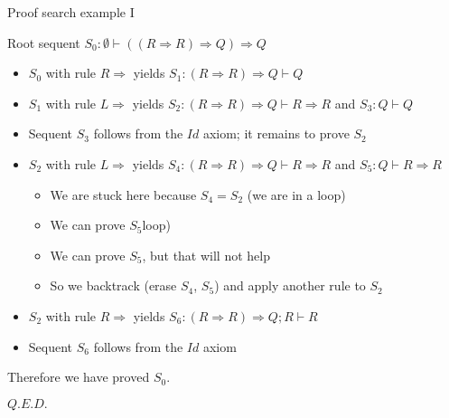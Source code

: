 \documentclass[english]{beamer}
\begin{document}
\begin{frame}{Proof search example I}

Root sequent $S_{0}:\emptyset\vdash\left(\left(R\Rightarrow R\right)\Rightarrow Q\right)\Rightarrow Q$
\begin{itemize}
\item $S_{0}$ with rule $R\Rightarrow$ yields $S_{1}:\left(R\Rightarrow R\right)\Rightarrow Q\vdash Q$
\item $S_{1}$ with rule $L\Rightarrow$ yields $S_{2}:\left(R\Rightarrow R\right)\Rightarrow Q\vdash R\Rightarrow R$
and $S_{3}:Q\vdash Q$
\item Sequent $S_{3}$ follows from the $Id$ axiom; it remains to prove
$S_{2}$
\item $S_{2}$ with rule $L\Rightarrow$ yields $S_{4}:\left(R\Rightarrow R\right)\Rightarrow Q\vdash R\Rightarrow R$
and $S_{5}:Q\vdash R\Rightarrow R$
\begin{itemize}
\item We are stuck here because $S_{4}=S_{2}$ (we are in a loop)
\item We can prove $S_{5}$loop)
\item We can prove $S_{5}$, but that will not help
\item So we backtrack (erase $S_{4}$, $S_{5}$) and apply another rule
to $S_{2}$
\end{itemize}
\item $S_{2}$ with rule $R\Rightarrow$ yields $S_{6}:\left(R\Rightarrow R\right)\Rightarrow Q;R\vdash R$
\item Sequent $S_{6}$ follows from the $Id$ axiom
\end{itemize}
Therefore we have proved $S_{0}$.

$Q.E.D.$
\end{frame}
\end{document}

